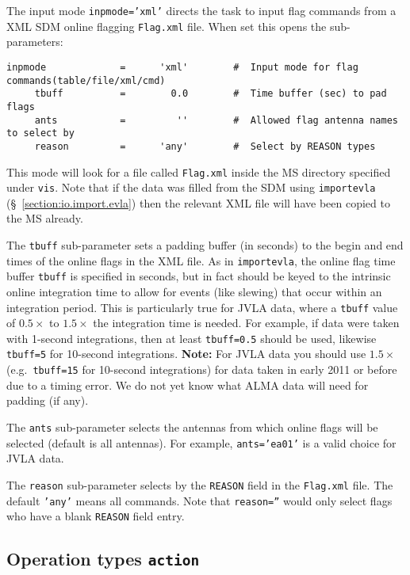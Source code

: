 The input mode {\tt inpmode='xml'} directs the
task to input flag commands from a XML SDM online flagging 
{\tt Flag.xml} file.  
When set this opens the sub-parameters:
\small
\begin{verbatim}
inpmode             =      'xml'        #  Input mode for flag commands(table/file/xml/cmd)
     tbuff          =        0.0        #  Time buffer (sec) to pad flags
     ants           =         ''        #  Allowed flag antenna names to select by
     reason         =      'any'        #  Select by REASON types
\end{verbatim}
\normalsize

This mode will look for a file called {\tt Flag.xml} inside the MS
directory specified under {\tt vis}.  Note that if the data was filled
from the SDM using {\tt importevla} (\S~\ref{section:io.import.evla})
then the relevant XML file will have been copied to the MS already.

The {\tt tbuff} sub-parameter sets a padding buffer (in seconds)
to the begin and end times of the online flags in the XML file.
As in {\tt importevla}, the online flag time buffer {\tt tbuff} is specified in
seconds, but in fact should be keyed to the intrinsic online 
integration time to allow for events (like slewing) that occur
within an integration period.  This is particularly true for JVLA data,
where a {\tt tbuff} value of $0.5\times$ to $1.5\times$ the
integration time is needed.  For example, if data were taken with
1-second integrations, then at least {\tt tbuff=0.5} should be used,
likewise {\tt tbuff=5} for 10-second integrations.
{\bf Note:} For JVLA data you should use $1.5\times$ (e.g.\ 
{\tt tbuff=15} for 10-second integrations) for data taken in 
early 2011 or before due to a timing error.  We do not yet know what
ALMA data will need for padding (if any).

The {\tt ants} sub-parameter selects the antennas from which
online flags will be selected (default is all antennas).  For example,
{\tt ants='ea01'} is a valid choice for JVLA data.

The {\tt reason} sub-parameter selects by the {\tt REASON} field in
the {\tt Flag.xml} file.  The default {\tt 'any'} means all commands.
Note that {\tt reason=''} would only select flags who have a blank {\tt REASON}
field entry.


\subsection{Operation types {\tt action}}
\label{section:edit.flagcmd.action}

